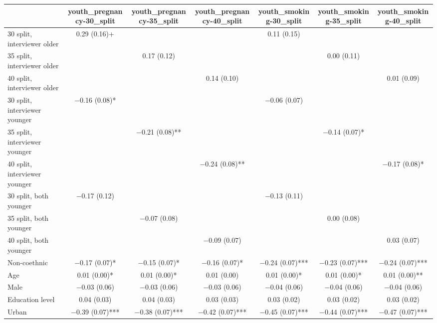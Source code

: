 \begin{table}
\centering
\begin{tabular}[t]{lcccccc}
\toprule
  & youth\_pregnancy-30\_split & youth\_pregnancy-35\_split & youth\_pregnancy-40\_split & youth\_smoking-30\_split & youth\_smoking-35\_split & youth\_smoking-40\_split\\
\midrule
30 split, interviewer older & \num{0.29} (\num{0.16})+ &  &  & \num{0.11} (\num{0.15}) &  & \\
35 split, interviewer older &  & \num{0.17} (\num{0.12}) &  &  & \num{0.00} (\num{0.11}) & \\
40 split, interviewer older &  &  & \num{0.14} (\num{0.10}) &  &  & \num{0.01} (\num{0.09})\\
30 split, interviewer younger & \num{-0.16} (\num{0.08})* &  &  & \num{-0.06} (\num{0.07}) &  & \\
35 split, interviewer younger &  & \num{-0.21} (\num{0.08})** &  &  & \num{-0.14} (\num{0.07})* & \\
40 split, interviewer younger &  &  & \num{-0.24} (\num{0.08})** &  &  & \num{-0.17} (\num{0.08})*\\
30 split, both younger & \num{-0.17} (\num{0.12}) &  &  & \num{-0.13} (\num{0.11}) &  & \\
35 split, both younger &  & \num{-0.07} (\num{0.08}) &  &  & \num{0.00} (\num{0.08}) & \\
40 split, both younger &  &  & \num{-0.09} (\num{0.07}) &  &  & \num{0.03} (\num{0.07})\\
Non-coethnic & \num{-0.17} (\num{0.07})* & \num{-0.15} (\num{0.07})* & \num{-0.16} (\num{0.07})* & \num{-0.24} (\num{0.07})*** & \num{-0.23} (\num{0.07})*** & \num{-0.24} (\num{0.07})***\\
Age & \num{0.01} (\num{0.00})* & \num{0.01} (\num{0.00})* & \num{0.01} (\num{0.00}) & \num{0.01} (\num{0.00})* & \num{0.01} (\num{0.00})* & \num{0.01} (\num{0.00})**\\
Male & \num{-0.03} (\num{0.06}) & \num{-0.03} (\num{0.06}) & \num{-0.03} (\num{0.06}) & \num{-0.04} (\num{0.06}) & \num{-0.04} (\num{0.06}) & \num{-0.04} (\num{0.06})\\
Education level & \num{0.04} (\num{0.03}) & \num{0.04} (\num{0.03}) & \num{0.03} (\num{0.03}) & \num{0.03} (\num{0.02}) & \num{0.03} (\num{0.02}) & \num{0.03} (\num{0.02})\\
Urban & \num{-0.39} (\num{0.07})*** & \num{-0.38} (\num{0.07})*** & \num{-0.42} (\num{0.07})*** & \num{-0.45} (\num{0.07})*** & \num{-0.44} (\num{0.07})*** & \num{-0.47} (\num{0.07})***\\

\end{tabular}
\end{table}
